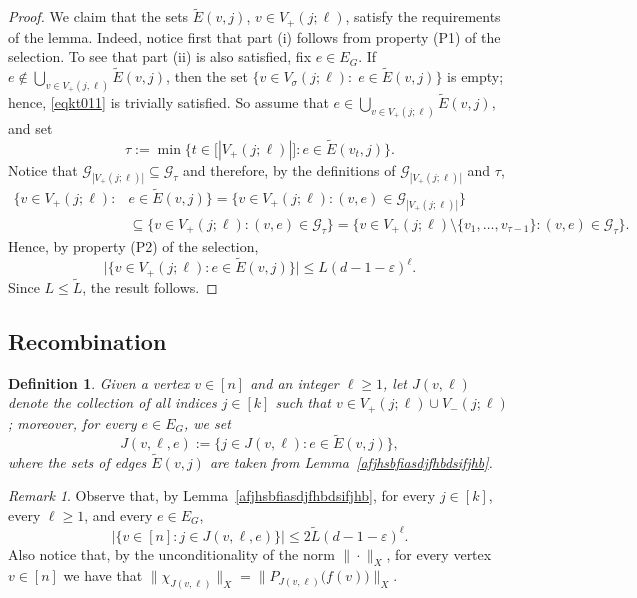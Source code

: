 \documentclass[11pt,leqno]{amsart}
\newtheorem{definition}[theorem]{Definition}
\theoremstyle{remark}
\newtheorem{remark}[theorem]{Remark}
\theoremstyle{plain}
\begin{document}
\begin{proof}
We claim that the sets $\tilde{E}(v,j)$, $v\in V_{+}(j;\ell)$, satisfy the requirements of the lemma.
Indeed, notice first that part (i) follows from property (P1) of the selection. To see that part (ii)
is also satisfied, fix $e\in E_G$. If $e\notin \bigcup_{v\in V_+(j,\ell)} \tilde E(v,j)$,
then the set $\{v\in V_{\sigma}(j;\ell):\;e\in \tilde E(v,j)\}$ is empty; hence, \eqref{eqkt011}
is trivially satisfied. So assume that $e\in \bigcup_{v\in V_+(j;\ell)} \tilde E(v,j)$, and set
$$\tau:= \min\big\{ t\in \big[|V_+(j;\ell)|\big]\colon e \in \tilde{E}(v_t,j)\big\}.$$
Notice that $\mathcal{G}_{|V_+(j;\ell)|}\subseteq \mathcal{G}_\tau$ and therefore, by the
definitions of $\mathcal{G}_{|V_+(j;\ell)|}$ and $\tau$,
\[\begin{split}
\big\{v\in V_+(j;\ell)\colon & e\in \tilde E(v,j)\big\}
= \big\{v\in V_+(j;\ell)\colon (v,e)\in \mathcal{G}_{|V_+(j;\ell)|}\big\}\\
& \subseteq \big\{v\in V_+(j;\ell)\colon (v,e)\in \mathcal{G}_\tau \big\}
= \big\{v\in V_+(j;\ell)\setminus \{v_1,\ldots,v_{\tau-1}\}\colon (v,e)\in \mathcal{G}_\tau\big\}.
\end{split}\]
Hence, by property (P2) of the selection,
\[ \big|\{v\in V_+(j;\ell)\colon e\in \tilde E(v,j)\}\big| \leqslant L(d-1-\varepsilon)^\ell.\]
Since $L\leqslant\tilde{L}$, the result follows.
\end{proof}

\subsection{Recombination}

\begin{definition} \label{def-jvl}
Given a vertex $v\in[n]$ and an integer $\ell\geqslant 1$, let $J(v,\ell)$ denote the collection of all indices $j\in [k]$
such that $v\in V_+(j;\ell)\cup V_-(j;\ell)$; moreover, for every $e\in E_G$, we set
$$ J(v,\ell,e):=\big\{j\in J(v,\ell)\colon e\in \tilde E(v,j)\big\}, $$
where the sets of edges $\tilde{E}(v,j)$ are taken from Lemma~\ref{afjhsbfiasdjfhbdsifjhb}.
\end{definition}
\begin{remark} \label{rem-new-3.8}
Observe that, by Lemma~\ref{afjhsbfiasdjfhbdsifjhb},
for every $j\in [k]$, every $\ell\geqslant 1$, and every $e\in E_G$,
$$ \big|\{v\in[n]\colon j\in J(v,\ell,e)\}\big|\leqslant 2\tilde L(d-1-\varepsilon)^\ell. $$
Also notice that, by the unconditionality of the norm $\|\cdot\|_X$, for every vertex $v\in [n]$ we have that
$\|\chi_{J(v,\ell)}\|_X=\big\|P_{J(v,\ell)}\big(f(v)\big)\big\|_X$.
\end{remark}
\end{document}
